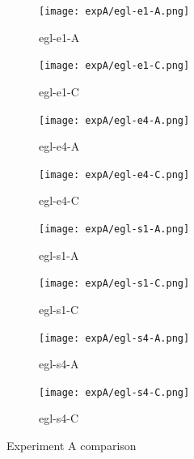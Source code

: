 \documentclass[twoside]{ctuthesis}
\theoremstyle{plain}
\theoremstyle{definition}
\theoremstyle{note}
\begin{document}
\begin{figure}[htbp]
	\centering
	
	\begin{subfigure}{0.45\textwidth}
		\texttt{[image: expA/egl-e1-A.png]}
		\caption{egl-e1-A}
		\label{fig:expA-e1-A}
	\end{subfigure}
	\hfill
	\begin{subfigure}{0.45\textwidth}
		\texttt{[image: expA/egl-e1-C.png]}
		\caption{egl-e1-C}
		\label{fig:expA-e1-C}
	\end{subfigure}
	
	\begin{subfigure}{0.45\textwidth}
		\texttt{[image: expA/egl-e4-A.png]}
		\caption{egl-e4-A}
		\label{fig:expA-e4-A}
	\end{subfigure}
	\hfill
	\begin{subfigure}{0.45\textwidth}
		\texttt{[image: expA/egl-e4-C.png]}
		\caption{egl-e4-C}
		\label{fig:expA-e4-C}
	\end{subfigure}
	
	\begin{subfigure}{0.45\textwidth}
		\texttt{[image: expA/egl-s1-A.png]}
		\caption{egl-s1-A}
		\label{fig:expA-s1-A}
	\end{subfigure}
	\hfill
	\begin{subfigure}{0.45\textwidth}
		\texttt{[image: expA/egl-s1-C.png]}
		\caption{egl-s1-C}
		\label{fig:expA-s1-C}
	\end{subfigure}
	
	\begin{subfigure}{0.45\textwidth}
		\texttt{[image: expA/egl-s4-A.png]}
		\caption{egl-s4-A}
		\label{fig:expA-s4-A}
	\end{subfigure}
	\hfill
	\begin{subfigure}{0.45\textwidth}
		\texttt{[image: expA/egl-s4-C.png]}
		\caption{egl-s4-C}
		\label{fig:expA-s4-C}
	\end{subfigure}
	
	\caption{Experiment A comparison}
	\label{fig:expA-comparison}
\end{figure}
\end{document}
